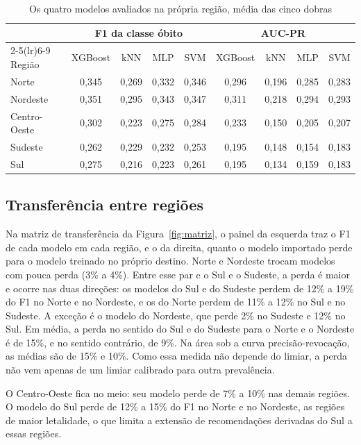 \documentclass[12pt]{article}
\begin{document}
\begin{table}[H]
\centering
\caption{Os quatro modelos avaliados na própria região, média das cinco
dobras}
\label{tab:modelos}
\footnotesize
\setlength{\tabcolsep}{4pt}
\begin{tabular}{lcccccccc}
\toprule
 & \multicolumn{4}{c}{F1 da classe óbito} & \multicolumn{4}{c}{AUC-PR} \\
\cmidrule(lr){2-5}\cmidrule(lr){6-9}
Região & XGBoost & kNN & MLP & SVM & XGBoost & kNN & MLP & SVM \\
\midrule
Norte        & 0,345 & 0,269 & 0,332 & 0,346 & 0,296 & 0,196 & 0,285 & 0,283 \\
Nordeste     & 0,351 & 0,295 & 0,343 & 0,347 & 0,311 & 0,218 & 0,294 & 0,293 \\
Centro-Oeste & 0,302 & 0,223 & 0,275 & 0,284 & 0,233 & 0,150 & 0,205 & 0,207 \\
Sudeste      & 0,262 & 0,229 & 0,232 & 0,253 & 0,195 & 0,148 & 0,154 & 0,183 \\
Sul          & 0,275 & 0,216 & 0,223 & 0,261 & 0,195 & 0,134 & 0,159 & 0,183 \\
\bottomrule
\end{tabular}
\end{table}

\subsection{Transferência entre regiões}

Na matriz de transferência da Figura~\ref{fig:matriz}, o painel da
esquerda traz o F1 de cada modelo em cada região, e o da direita, quanto
o modelo importado perde para o modelo treinado no próprio destino.
Norte e Nordeste trocam modelos com pouca perda (3\% a 4\%). Entre esse
par e o Sul e o Sudeste, a perda é maior e ocorre nas duas direções: os
modelos do Sul e do Sudeste perdem de 12\% a 19\% do F1 no Norte e no
Nordeste, e os do Norte perdem de 11\% a 12\% no Sul e no Sudeste. A
exceção é o modelo do Nordeste, que perde 2\% no Sudeste e 12\% no Sul.
Em média, a perda no sentido do Sul e do Sudeste para o Norte e o
Nordeste é de 15\%, e no sentido contrário, de 9\%. Na área sob a curva
precisão-revocação, as médias são de 15\% e 10\%. Como essa medida não
depende do limiar, a perda não vem apenas de um limiar calibrado para
outra prevalência.

O Centro-Oeste fica no meio: seu modelo perde de 7\% a 10\% nas demais
regiões. O modelo do Sul perde de 12\% a 15\% do F1 no Norte e no
Nordeste, as regiões de maior letalidade, o que limita a extensão de recomendações
derivadas do Sul a essas regiões.
\end{document}

